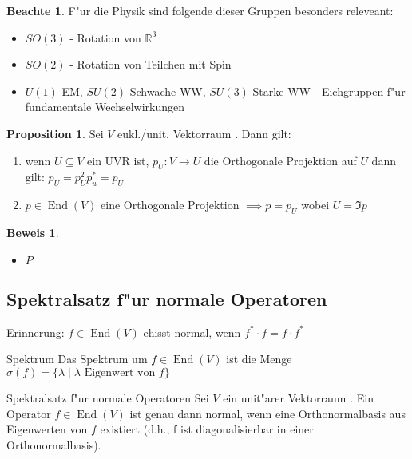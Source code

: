 \documentclass[oneside,fontsize=11pt,paper=a4,BCOR=0mm,DIV=12,automark,headsepline]{scrbook}
\DeclareMathOperator{\mEnd}{End}
\theoremstyle{remark}
\theoremstyle{definition}
\newtheorem*{notte}{Beachte}
\newtheorem*{proposition}{Proposition}
\theoremstyle{definition}
\newtheorem*{prof}{Beweis}
\theoremstyle{remark}
\begin{document}
\begin{notte}
  F"ur die Physik sind folgende dieser Gruppen besonders releveant:
  \begin{itemize}
  \item $SO(3)$ - Rotation von $\mathbb{R}^3$
  \item $SO(2)$ - Rotation von Teilchen mit Spin
  \item $U(1)$ EM, $SU(2)$ Schwache WW, $SU(3)$ Starke WW - Eichgruppen f"ur fundamentale Wechselwirkungen
  \end{itemize}
\end{notte}

\begin{proposition}
  Sei $V$ eukl./unit. Vektorraum . Dann gilt:
  \begin{enumerate}
  \item wenn $U\subseteq V$ ein UVR ist, $p_U: V\rightarrow U$ die Orthogonale
    Projektion auf $U$ dann gilt: $p_U=p_U^2 p_u^*= p_U$
    
  \item $p\in \mEnd (V)$ eine Orthogonale Projektion $\implies p = p_U $ wobei
    $U=\Im p$
  \end{enumerate}
\end{proposition}
\begin{prof}
  \begin{itemize}
  \item $P$
  \end{itemize}
\end{prof}

\subsection{Spektralsatz f"ur normale Operatoren}
\label{sec:spekt}
Erinnerung: $f\in \mEnd (V)$ ehisst normal, wenn $f^*\cdot f = f\cdot f^*$

\begin{definition}{Spektrum}{}
  Das Spektrum um $f\in \mEnd (V)$ ist die Menge $\sigma (f) = \{\lambda \mid
  \lambda \text{ Eigenwert von } f\}$
\end{definition}

\begin{satz}{Spektralsatz f"ur normale Operatoren}
  Sei $V$ ein unit"arer Vektorraum
  . Ein Operator $f\in \mEnd (V)$ ist genau dann normal, wenn eine
  Orthonormalbasis aus Eigenwerten von $f$ existiert (d.h., f ist
  diagonalisierbar in einer Orthonormalbasis).
\end{satz}
\end{document}
